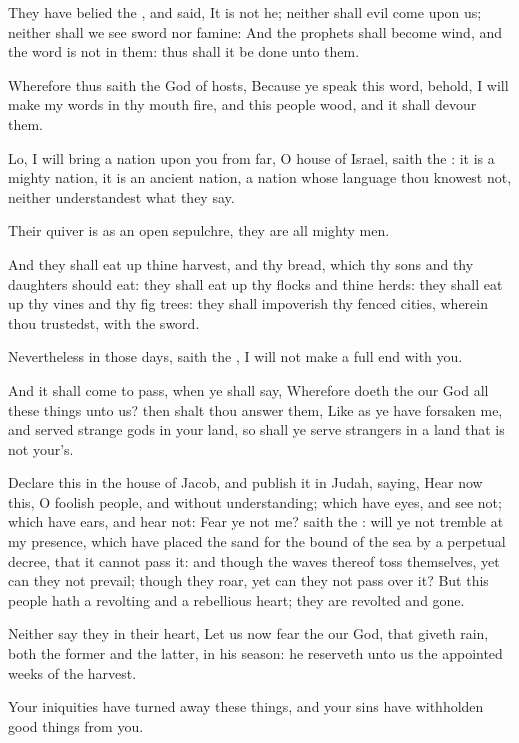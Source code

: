 \verse They have belied the \LORD, and said, It is not he; neither shall evil come upon us; neither shall we see sword nor famine: \verse And the prophets shall become wind, and the word is not in them: thus shall it be done unto them.

\verse Wherefore thus saith the \LORD God of hosts, Because ye speak this word, behold, I will make my words in thy mouth fire, and this people wood, and it shall devour them.

\verse Lo, I will bring a nation upon you from far, O house of Israel, saith the \LORD: it is a mighty nation, it is an ancient nation, a nation whose language thou knowest not, neither understandest what they say.

\verse Their quiver is as an open sepulchre, they are all mighty men.

\verse And they shall eat up thine harvest, and thy bread, which thy sons and thy daughters should eat: they shall eat up thy flocks and thine herds: they shall eat up thy vines and thy fig trees: they shall impoverish thy fenced cities, wherein thou trustedst, with the sword.

\verse Nevertheless in those days, saith the \LORD, I will not make a full end with you.

\verse And it shall come to pass, when ye shall say, Wherefore doeth the \LORD our God all these things unto us? then shalt thou answer them, Like as ye have forsaken me, and served strange gods in your land, so shall ye serve strangers in a land that is not your's.

\verse Declare this in the house of Jacob, and publish it in Judah, saying, \verse Hear now this, O foolish people, and without understanding; which have eyes, and see not; which have ears, and hear not: \verse Fear ye not me? saith the \LORD: will ye not tremble at my presence, which have placed the sand for the bound of the sea by a perpetual decree, that it cannot pass it: and though the waves thereof toss themselves, yet can they not prevail; though they roar, yet can they not pass over it?  \verse But this people hath a revolting and a rebellious heart; they are revolted and gone.

\verse Neither say they in their heart, Let us now fear the \LORD our God, that giveth rain, both the former and the latter, in his season: he reserveth unto us the appointed weeks of the harvest.

\verse Your iniquities have turned away these things, and your sins have withholden good things from you.

